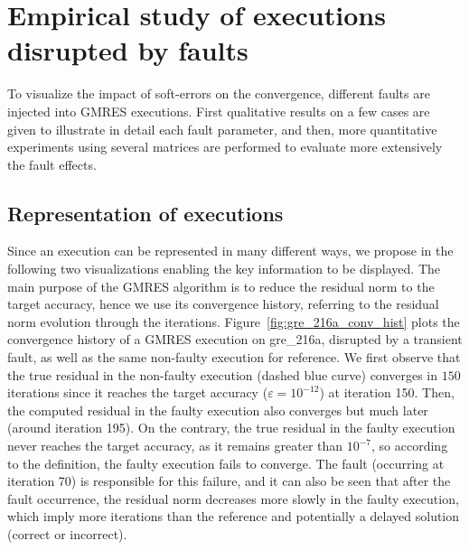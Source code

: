 \documentclass[twoside]{article}
\newcounter{fig}\setcounter{fig}{0}
\begin{document}



\section{Empirical study of executions disrupted by faults}\label{sec:empirical}
To visualize the impact of soft-errors on the convergence, different faults are injected into GMRES executions. First qualitative results on a few cases are given to illustrate in detail each fault parameter, and then, more quantitative experiments  using several matrices are performed to evaluate more extensively the fault effects. 

\subsection{Representation of executions}
Since an execution can be represented in many different ways, we propose in the following two visualizations enabling the key information to be displayed. The main purpose of the GMRES algorithm is to reduce the residual norm to the target accuracy, hence we use its convergence history, referring to the residual norm evolution through the iterations. Figure~\ref{fig:gre_216a_conv_hist} plots the convergence history of a GMRES execution on gre_216a, disrupted by a transient fault, as well as the same non-faulty execution for reference. We first observe that the true residual in the non-faulty execution (dashed blue curve) converges in $150$ iterations since it reaches the target accuracy ($\varepsilon = 10^{-12}$) at iteration 150. Then, the computed residual in the faulty execution also converges but much later (around iteration 195). On the contrary, the true residual in the faulty execution never reaches the target accuracy, as it remains greater than $10^{-7}$, so according to the definition, the faulty execution fails to converge. The fault (occurring at iteration 70) is responsible for this failure, and it can also be seen that after the fault occurrence, the residual norm decreases more slowly in the faulty execution, which imply more iterations than the reference and potentially a delayed solution (correct or incorrect).
\end{document}
